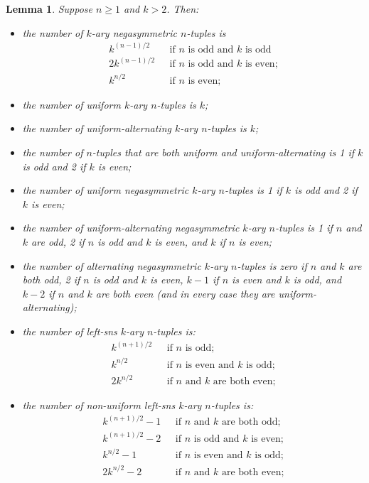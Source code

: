 \documentclass[a4paper,11pt]{article}
\theoremstyle{plain}
\newtheorem{lemma}{Lemma}[section]
\theoremstyle{definition}
\theoremstyle{remark}
\begin{document}
\begin{lemma}  \label{lemma:NOS_tuple_numbers}
Suppose $n\geq1$ and $k>2$.  Then:
\begin{itemize}
\item[i)]  the number of $k$-ary negasymmetric $n$-tuples is
\begin{align*}
k^{(n-1)/2} & \mbox{~~if $n$ is odd and $k$ is odd} \\
2k^{(n-1)/2} & \mbox{~~if $n$ is odd and $k$ is even;} \\
k^{n/2} & \mbox{~~if $n$ is even;}
\end{align*}
\item[ii)] the number of uniform $k$-ary $n$-tuples is $k$;
\item[iii)] the number of uniform-alternating $k$-ary $n$-tuples is $k$;
\item[iv)] the number of $n$-tuples that are both uniform and uniform-alternating is 1 if
    $k$ is odd and 2 if $k$ is even;
\item[v)] the number of uniform negasymmetric $k$-ary $n$-tuples is 1 if $k$ is odd and 2 if
    $k$ is even;
\item[vi)] the number of uniform-alternating negasymmetric $k$-ary $n$-tuples is 1 if $n$ and
    $k$ are odd, 2 if $n$ is odd and $k$ is even, and $k$ if $n$ is even;
\item[vii)] the number of alternating negasymmetric $k$-ary $n$-tuples is zero if $n$ and $k$
    are both odd, 2 if $n$ is odd and $k$ is even, $k-1$ if $n$ is even and $k$ is odd, and
    $k-2$ if $n$ and $k$ are both even (and in every case they are uniform-alternating);
\item[viii)] the number of left-sns $k$-ary $n$-tuples is:
\begin{align*}
k^{(n+1)/2} & \mbox{~~if $n$ is odd;} \\
k^{n/2} & \mbox{~~if $n$ is even and $k$ is odd;} \\
2k^{n/2} & \mbox{~~if $n$ and $k$ are both even;}
\end{align*}
\item[ix)] the number of non-uniform left-sns $k$-ary $n$-tuples is:
\begin{align*}
k^{(n+1)/2}-1 & \mbox{~~if $n$ and $k$ are both odd;} \\
k^{(n+1)/2}-2 & \mbox{~~if $n$ is odd and $k$ is even;} \\
k^{n/2}-1 & \mbox{~~if $n$ is even and $k$ is odd;} \\
2k^{n/2}-2 & \mbox{~~if $n$ and $k$ are both even;}

\end{align*}
\end{itemize}
\end{lemma}
\end{document}
